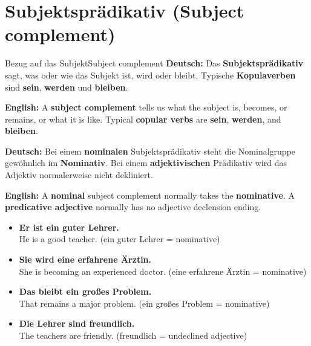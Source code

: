 \documentclass[a4paper,11pt]{article}
\newcommand{\GermanText}[1]{\textbf{Deutsch: }#1\par}
\newcommand{\EnglishText}[1]{{\small\color{SoftGray}\textbf{English: }#1\par}}
\newcommand{\ExampleItem}[2]{\item \textbf{#1}\\{\small\color{SoftGray}#2}}
\begin{document}
\section{Subjektsprädikativ \textnormal{(Subject complement)}}
\begin{grammarentry}{Bezug auf das Subjekt}{Subject complement}
\GermanText{Das \textbf{Subjektsprädikativ} sagt, was oder wie das Subjekt ist, wird oder bleibt. Typische \textbf{Kopulaverben} sind \textbf{sein}, \textbf{werden} und \textbf{bleiben}.}
\EnglishText{A \textbf{subject complement} tells us what the subject is, becomes, or remains, or what it is like. Typical \textbf{copular verbs} are \textbf{sein}, \textbf{werden}, and \textbf{bleiben}.}
\GermanText{Bei einem \textbf{nominalen} Subjektsprädikativ steht die Nominalgruppe gewöhnlich im \textbf{Nominativ}. Bei einem \textbf{adjektivischen} Prädikativ wird das Adjektiv normalerweise nicht dekliniert.}
\EnglishText{A \textbf{nominal} subject complement normally takes the \textbf{nominative}. A \textbf{predicative adjective} normally has no adjective declension ending.}
\end{grammarentry}
\begin{exbox}\begin{itemize}
\ExampleItem{Er ist ein guter Lehrer.}{He is a good teacher. (ein guter Lehrer = nominative)}
\ExampleItem{Sie wird eine erfahrene Ärztin.}{She is becoming an experienced doctor. (eine erfahrene Ärztin = nominative)}
\ExampleItem{Das bleibt ein großes Problem.}{That remains a major problem. (ein großes Problem = nominative)}
\ExampleItem{Die Lehrer sind freundlich.}{The teachers are friendly. (freundlich = undeclined adjective)}
\end{itemize}\end{exbox}
\end{document}
